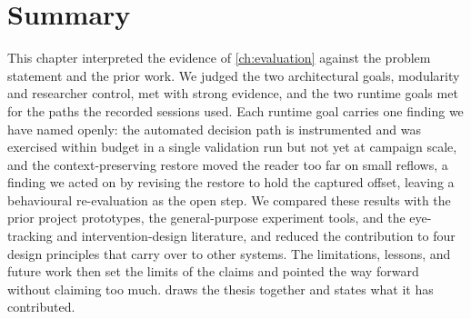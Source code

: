 \section{Summary}
\label{sec:disc-summary}

This chapter interpreted the evidence of \cref{ch:evaluation} against the problem statement and the prior work.
We judged the two architectural goals, modularity and researcher control, met with strong evidence, and the two runtime goals met for the paths the recorded sessions used.
Each runtime goal carries one finding we have named openly: the automated decision path is instrumented and was exercised within budget in a single validation run but not yet at campaign scale, and the context-preserving restore moved the reader too far on small reflows, a finding we acted on by revising the restore to hold the captured offset, leaving a behavioural re-evaluation as the open step.
We compared these results with the prior project prototypes, the general-purpose experiment tools, and the eye-tracking and intervention-design literature, and reduced the contribution to four design principles that carry over to other systems.
The limitations, lessons, and future work then set the limits of the claims and pointed the way forward without claiming too much.
 draws the thesis together and states what it has contributed.
